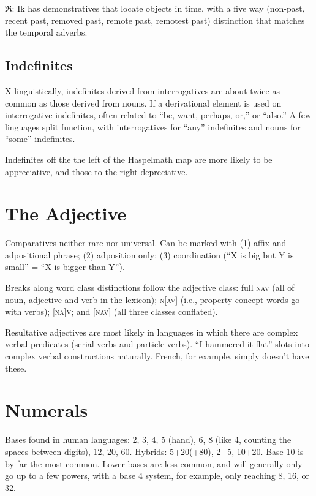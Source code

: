 \documentclass[11pt]{article}
\newcommand{\I}[1]{\textsc{#1}}   %
\newcommand{\rara}[1]{$\mathfrak{R}$: #1}
\begin{document}
\rara{Ik has demonstratives that locate objects in time, with a
five way (non-past, recent past, removed past, remote past, remotest
past) distinction that matches the temporal adverbs.}

\subsection{Indefinites}
X-linguistically, indefinites derived from interrogatives are about
twice as common as those derived from nouns. If a derivational element
is used on interrogative indefinites, often related to ``be, want,
perhaps, or,'' or ``also.'' A few linguages split function, with
interrogatives for ``any'' indefinites and nouns for ``some''
indefinites.

Indefinites off the the left of the Haspelmath map are more likely to
be appreciative, and those to the right depreciative.



\section{The Adjective}
Comparatives neither rare nor universal.  Can be marked with (1) affix
and adpositional phrase; (2) adposition only; (3) coordination (``X is
big but Y is small'' = ``X is bigger than Y'').

Breaks along word class distinctions follow the adjective class: full
\I{nav} (all of noun, adjective and verb in the lexicon); \I{n[av]}
(i.e., property-concept words go with verbs); \I{[na]v}; and \I{[nav]}
(all three classes conflated).

Resultative adjectives are most likely in languages in which there are
complex verbal predicates (serial verbs and particle verbs). ``I
hammered it flat'' slots into complex verbal constructions naturally.
French, for example, simply doesn't have these.


\section{Numerals}
Bases found in human languages: 2, 3, 4, 5 (hand), 6, 8 (like 4,
counting the spaces between digits), 12, 20, 60.  Hybrids: 5+20(+80),
2+5, 10+20.  Base 10 is by far the most common.  Lower bases are less
common, and will generally only go up to a few powers, with a base 4
system, for example, only reaching 8, 16, or 32.
\end{document}
